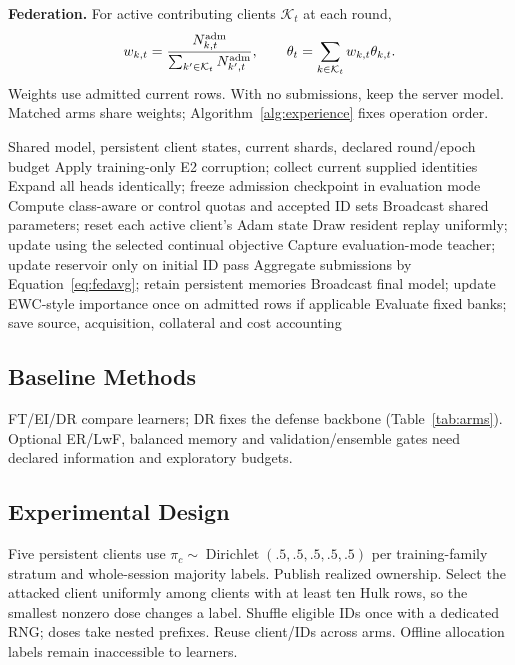 \documentclass[10pt,a4paper]{article}
\begin{document}
\textbf{Federation.} For active contributing clients $\mathcal K_t$ at each round,
\begin{equation}
w_{k,t}=\frac{N^{\rm adm}_{k,t}}{\sum_{k'\in\mathcal K_t}N^{\rm adm}_{k',t}},\qquad
\theta_t=\sum_{k\in\mathcal K_t}w_{k,t}\theta_{k,t}.
\label{eq:fedavg}
\end{equation}
Weights use admitted current rows. With no submissions, keep the server model. Matched arms share weights; Algorithm~\ref{alg:experience} fixes operation order.

\begin{algorithm}[htbp]
\caption{One proposed supervised experience}
\label{alg:experience}
\begin{algorithmic}[1]
\Require Shared model, persistent client states, current shards, declared round/epoch budget
\State Apply training-only E2 corruption; collect current supplied identities
\State Expand all heads identically; freeze admission checkpoint in evaluation mode
\State Compute class-aware or control quotas and accepted ID sets
\State Broadcast shared parameters; reset each active client's Adam state
\State Draw resident replay uniformly; update using the selected continual objective
\State Capture evaluation-mode teacher; update reservoir only on initial ID pass
\EndFor
\State Aggregate submissions by Equation~\eqref{eq:fedavg}; retain persistent memories
\EndFor
\State Broadcast final model; update EWC-style importance once on admitted rows if applicable
\State Evaluate fixed banks; save source, acquisition, collateral and cost accounting
\end{algorithmic}
\end{algorithm}
\subsection{Baseline Methods}
FT/EI/DR compare learners; DR fixes the defense backbone (Table~\ref{tab:arms}). Optional ER/LwF, balanced memory and validation/ensemble gates need declared information and exploratory budgets.

\subsection{Experimental Design}
Five persistent clients use $\pi_c\sim\operatorname{Dirichlet}(.5,.5,.5,.5,.5)$ per training-family stratum and whole-session majority labels. Publish realized ownership. Select the attacked client uniformly among clients with at least ten Hulk rows, so the smallest nonzero dose changes a label. Shuffle eligible IDs once with a dedicated RNG; doses take nested prefixes. Reuse client/IDs across arms. Offline allocation labels remain inaccessible to learners.
\end{document}
